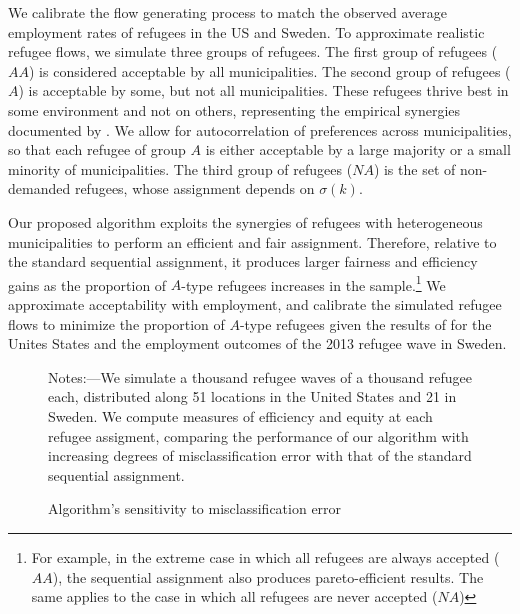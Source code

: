 \documentclass[11pt]{article}
\begin{document}
We calibrate the flow generating process to match the observed average employment rates of refugees in the US and Sweden. To approximate realistic refugee flows, we simulate three groups of refugees. The first group of refugees ($AA$) is considered acceptable by all municipalities. The second group of refugees ($A$) is acceptable by some, but not all municipalities. These refugees thrive best in some environment and not on others, representing the empirical synergies documented by \cite{bansak_improving_2018}. We allow for autocorrelation of preferences across municipalities, so that each refugee of group $A$ is either acceptable by a large majority or a small minority of municipalities. The third group of refugees ($NA$) is the set of non-demanded refugees, whose assignment depends on $\sigma(k)$. 

Our proposed algorithm exploits the synergies of refugees with heterogeneous municipalities to perform an efficient and fair assignment. Therefore, relative to the standard sequential assignment, it produces larger fairness and efficiency gains as the proportion of $A$-type refugees increases in the sample.\footnote{For example, in the extreme case in which all refugees are always accepted ($AA$), the sequential assignment also produces pareto-efficient results. The same applies to the case in which all refugees are never accepted ($NA$)} We approximate acceptability with employment, and calibrate the simulated refugee flows to minimize the proportion of $A$-type refugees given the results of \cite{bansak_improving_2018} for the Unites States and the employment outcomes of the 2013 refugee wave in Sweden.

\begin{figure}
	\caption{Algorithm's sensitivity to misclassification error \label{FIG-miclassification}}



	{\footnotesize {\sc Notes:}---We simulate a thousand refugee waves of a thousand refugee each, distributed along 51 locations in the United States and 21 in Sweden. We compute measures of efficiency and equity at each refugee assigment, comparing the performance of our algorithm with increasing degrees of misclassification error with that of the standard sequential assignment.}
\end{figure}
\end{document}

